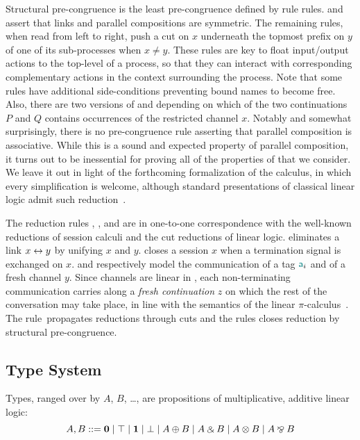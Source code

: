 Structural pre-congruence is the least pre-congruence defined by rule
 rules.
%
\SLink and \SComm assert that links and parallel compositions are symmetric. The
remaining rules, when read from left to right, push a cut on $x$ underneath the
topmost prefix on $y$ of one of its sub-processes when $x \ne y$. These rules
are key to float input/output actions to the top-level of a process, so that
they can interact with corresponding complementary actions in the context
surrounding the process.
%
Note that some rules have additional side-conditions preventing bound names to
become free. Also, there are two
versions of \SForkL and \SForkR depending on which of the two continuations $P$
and $Q$ contains occurrences of the restricted channel $x$.
%
Notably and somewhat surprisingly, there is no pre-congruence rule asserting
that parallel composition is associative. While this is a sound and expected
property of parallel composition, it turns out to be inessential for proving all
of the properties of \Calculus that we consider. We leave it out in light of the
forthcoming formalization of the calculus, in which every simplification is
welcome, although standard presentations of classical linear logic admit such
reduction~\cite{Doumane17}.

The reduction rules \RLink, \RClose, \RSelect and \RFork are in one-to-one
correspondence with the well-known reductions of session calculi and the cut
reductions of linear logic. \RLink eliminates a link $x\leftrightarrow y$ by unifying $x$
and $y$. \RClose closes a session $x$ when a termination signal is exchanged on
$x$. \RSelect and \RFork respectively model the communication of a tag $\mathsf{\color{teal}a}_i$
and of a fresh channel $y$. Since channels are linear in \Calculus, each
non-terminating communication carries along a \emph{fresh continuation} $z$ on
which the rest of the conversation may take place, in line with the semantics of
the linear $\pi$-calculus~\cite{KobayashiPierceTurner99}.
%
The rule~\RCut propagates reductions through cuts and the rules \RCong closes
reduction by structural pre-congruence.

\subsection{Type System}

Types, ranged over by $A$, $B$, \dots, are propositions of multiplicative,
additive linear logic:
\[
    A, B ::= \mathbf{0} \mid \top \mid \mathbf{1} \mid \bot \mid A \mathbin\oplus B \mid A \mathbin\binampersand B \mid A \mathbin\otimes B \mid A \mathbin\bindnasrepma B
\]


